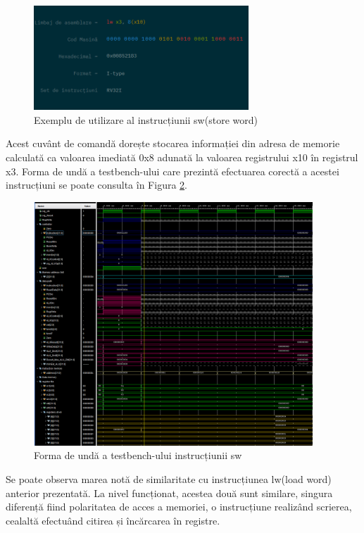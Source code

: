 \documentclass[12pt]{article}
\begin{document}
\newpage
  \begin{figure}[h!]
 \hspace*{-0.1cm}\includegraphics[width=0.72\textwidth]{lwtype.png}
 \centering
 \caption{Exemplu de utilizare al instrucțiunii sw(store word)}
 \label{Figura:67}
 \end{figure}

Acest cuvânt de comandă dorește stocarea informației din adresa de memorie calculată ca valoarea imediată 0x8 adunată la valoarea registrului x10 în registrul x3. Forma de undă a testbench-ului care prezintă efectuarea corectă a acestei instrucțiuni se poate consulta în Figura \ref{Figura:68}.

   \begin{figure}[h!]
 \hspace*{-0.1cm}\includegraphics[width=0.935\textwidth]{lwexample.png}
 \centering
 \caption{Forma de undă a testbench-ului instrucțiunii sw}
 \label{Figura:68}
 \end{figure}
 
 Se poate observa marea notă de similaritate cu instrucțiunea lw(load word) anterior prezentată. La nivel funcționat, acestea două sunt similare, singura diferență fiind polaritatea de acces a memoriei, o instrucțiune realizând scrierea, cealaltă efectuând citirea și încărcarea în registre.
 
\end{document}
